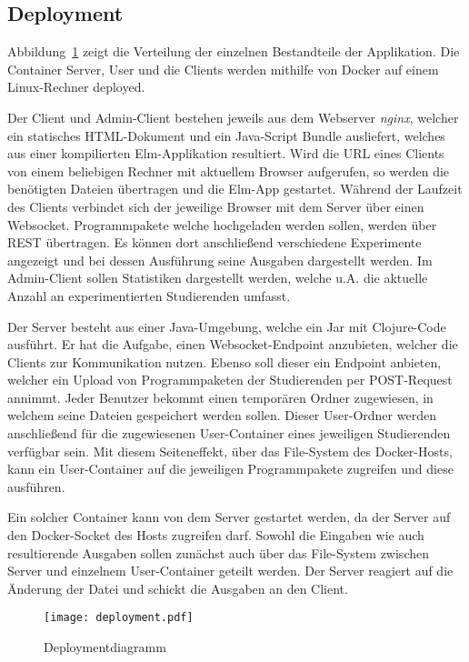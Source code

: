 \subsection{Deployment}
Abbildung~\ref{fig:deployment} zeigt die Verteilung der einzelnen Bestandteile der Applikation.
Die Container Server, User und die Clients werden mithilfe von Docker auf einem Linux-Rechner deployed.
\par
Der Client und Admin-Client bestehen jeweils aus dem Webserver \textit{nginx}, welcher ein statisches HTML-Dokument und ein Java-Script Bundle ausliefert, welches aus einer kompilierten Elm-Applikation resultiert.
Wird die URL eines Clients von einem beliebigen Rechner mit aktuellem Browser aufgerufen, so werden die benötigten Dateien übertragen und die Elm-App gestartet.
Während der Laufzeit des Clients verbindet sich der jeweilige Browser mit dem Server über einen Websocket.
Programmpakete welche hochgeladen werden sollen, werden über REST übertragen.
Es können dort anschließend verschiedene Experimente angezeigt und bei dessen Ausführung seine Ausgaben dargestellt werden.
Im Admin-Client sollen Statistiken dargestellt werden, welche u.A. die aktuelle Anzahl an experimentierten Studierenden umfasst.
\par
Der Server besteht aus einer Java-Umgebung, welche ein Jar mit Clojure-Code ausführt.
Er hat die Aufgabe, einen Websocket-Endpoint anzubieten, welcher die Clients zur Kommunikation nutzen.
Ebenso soll dieser ein Endpoint anbieten, welcher ein Upload von Programmpaketen der Studierenden per POST-Request annimmt.
Jeder Benutzer bekommt einen temporären Ordner zugewiesen, in welchem seine Dateien gespeichert werden sollen.
Dieser User-Ordner werden anschließend für die zugewiesenen User-Container eines jeweiligen Studierenden verfügbar sein.
Mit diesem Seiteneffekt, über das File-System des Docker-Hosts, kann ein User-Container auf die jeweiligen Programmpakete zugreifen und diese ausführen.
\par
Ein solcher Container kann von dem Server gestartet werden, da der Server auf den Docker-Socket des Hosts zugreifen darf.
Sowohl die Eingaben wie auch resultierende Ausgaben sollen zunächst auch über das File-System zwischen Server und einzelnem User-Container geteilt werden.
Der Server reagiert auf die Änderung der Datei und schickt die Ausgaben an den Client.

\begin{landscape}
  \begin{figure}[h]
    \centering
    \texttt{[image: deployment.pdf]}
    \caption{Deploymentdiagramm}
    \label{fig:deployment}
  \end{figure}
\end{landscape}

